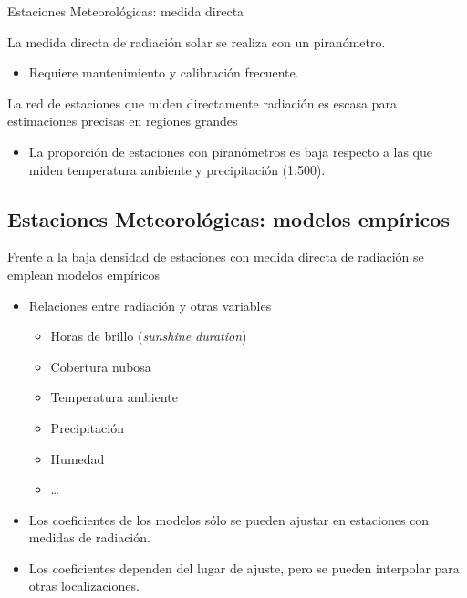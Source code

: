 \documentclass[xcolor={usenames,svgnames,dvipsnames}]{beamer}
\begin{document}
\begin{frame}[label={sec:org1609de7}]{Estaciones Meteorológicas: medida directa}
\begin{block}{La medida directa de radiación solar se realiza con un piranómetro.}
\begin{itemize}
\item Requiere mantenimiento y calibración frecuente.
\end{itemize}
\end{block}

\begin{block}{La red de estaciones que miden directamente radiación es escasa para estimaciones precisas en regiones grandes}
\begin{itemize}
\item La proporción de estaciones con piranómetros es baja respecto a
las que miden temperatura ambiente y precipitación (1:500).
\end{itemize}
\end{block}
\end{frame}

\subsection{Estaciones Meteorológicas: modelos empíricos}
\label{sec:org719ed12}
\begin{frame}[label={sec:orgcecec50}]{Frente a la baja densidad de estaciones con medida directa de radiación se emplean modelos empíricos}
\begin{itemize}
\item Relaciones entre radiación y otras variables
\begin{itemize}
\item Horas de brillo (\emph{sunshine duration})
\item Cobertura nubosa
\item Temperatura ambiente
\item Precipitación
\item Humedad
\item \ldots{}
\end{itemize}
\item Los coeficientes de los modelos sólo se pueden ajustar en estaciones
con medidas de radiación.
\item Los coeficientes dependen del lugar de ajuste, pero se pueden
interpolar para otras localizaciones.
\end{itemize}
\end{frame}
\end{document}
